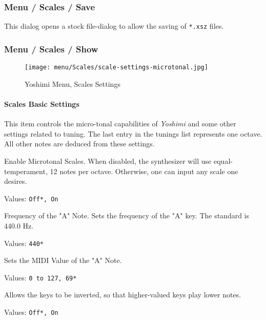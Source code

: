 \subsubsection{Menu / Scales / Save}
\label{subsec:menu_scales_save}

   This dialog opens a stock file-dialog to allow the saving of
   \texttt{*.xsz} files.

\subsubsection{Menu / Scales / Show}
\label{subsec:menu_scales_show}

\begin{figure}[H]
   \centering 
   \texttt{[image: menu/Scales/scale-settings-microtonal.jpg]}
   \caption{Yoshimi Menu, Scales Settings}
   \label{fig:yoshimi_menu_scales_settings}
\end{figure}

\paragraph{Scales Basic Settings}
\label{paragraph:menu_scales_basic_settings}

   This item controls the micro-tonal capabilities of \textsl{Yoshimi} and
   some other settings related to tuning. 
   The last entry in the tunings list represents one octave.
   All other notes are deduced from these settings.

   \setcounter{ItemCounter}{0}      %

   Enable Microtonal Scales.
   When disabled, the synthesizer will use equal-temperament, 12 notes per
   octave.  Otherwise, one can input any scale one desires.

   Values: \texttt{Off*, On}

   Frequency of the "A" Note.
   Sets the frequency of the "A" key. The standard is 440.0 Hz.

   Values: \texttt{440*}

   Sets the MIDI Value of the "A" Note.

   Values: \texttt{0 to 127, 69*}

   Allows the keys to be inverted, so that higher-valued keys play lower
   notes.

   Values: \texttt{Off*, On}

